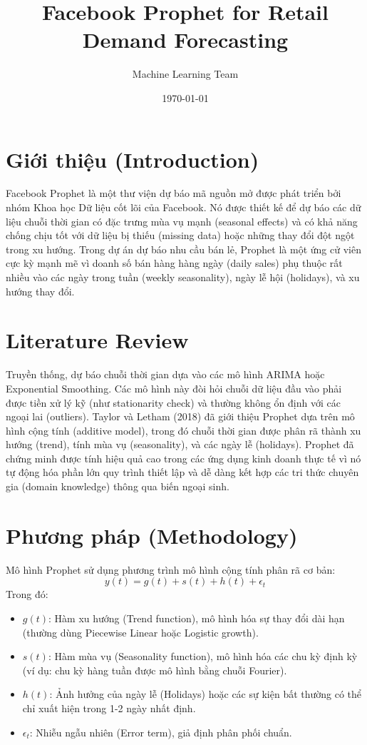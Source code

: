 \documentclass{article}
\title{Facebook Prophet for Retail Demand Forecasting}
\author{Machine Learning Team}
\date{\today}
\begin{document}
\maketitle

\section{Giới thiệu (Introduction)}
Facebook Prophet là một thư viện dự báo mã nguồn mở được phát triển bởi nhóm Khoa học Dữ liệu cốt lõi của Facebook. Nó được thiết kế để dự báo các dữ liệu chuỗi thời gian có đặc trưng mùa vụ mạnh (seasonal effects) và có khả năng chống chịu tốt với dữ liệu bị thiếu (missing data) hoặc những thay đổi đột ngột trong xu hướng. Trong dự án dự báo nhu cầu bán lẻ, Prophet là một ứng cử viên cực kỳ mạnh mẽ vì doanh số bán hàng hàng ngày (daily sales) phụ thuộc rất nhiều vào các ngày trong tuần (weekly seasonality), ngày lễ hội (holidays), và xu hướng thay đổi.

\section{Literature Review}
Truyền thống, dự báo chuỗi thời gian dựa vào các mô hình ARIMA hoặc Exponential Smoothing. Các mô hình này đòi hỏi chuỗi dữ liệu đầu vào phải được tiền xử lý kỹ (như stationarity check) và thường không ổn định với các ngoại lai (outliers). Taylor và Letham (2018) đã giới thiệu Prophet dựa trên mô hình cộng tính (additive model), trong đó chuỗi thời gian được phân rã thành xu hướng (trend), tính mùa vụ (seasonality), và các ngày lễ (holidays). Prophet đã chứng minh được tính hiệu quả cao trong các ứng dụng kinh doanh thực tế vì nó tự động hóa phần lớn quy trình thiết lập và dễ dàng kết hợp các tri thức chuyên gia (domain knowledge) thông qua biến ngoại sinh.

\section{Phương pháp (Methodology)}
Mô hình Prophet sử dụng phương trình mô hình cộng tính phân rã cơ bản:
\begin{equation}
y(t) = g(t) + s(t) + h(t) + \epsilon_t
\end{equation}
Trong đó:
\begin{itemize}
    \item $g(t)$: Hàm xu hướng (Trend function), mô hình hóa sự thay đổi dài hạn (thường dùng Piecewise Linear hoặc Logistic growth).
    \item $s(t)$: Hàm mùa vụ (Seasonality function), mô hình hóa các chu kỳ định kỳ (ví dụ: chu kỳ hàng tuần được mô hình bằng chuỗi Fourier).
    \item $h(t)$: Ảnh hưởng của ngày lễ (Holidays) hoặc các sự kiện bất thường có thể chỉ xuất hiện trong 1-2 ngày nhất định.
    \item $\epsilon_t$: Nhiễu ngẫu nhiên (Error term), giả định phân phối chuẩn.
\end{itemize}
\end{document}
